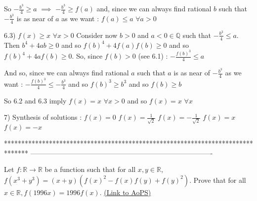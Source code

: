 \begin{solution}
So $ -\frac{b^3}{4}\geq a$ $ \implies$ $ -\frac{b^3}{4}\geq f(a)$ and, since we can always find rational $ b$ such that $ -\frac{b^3}{4}$ is as near of $ a$ as we want : $ f(a)\leq a$ $ \forall a>0$

6.3) $ f(x)\geq x$ $ \forall x>0$
Consider now $ b>0$ and $ a<0\in\mathbb Q$ such that $ -\frac{b^3}{4}\leq a$. Then $ b^4+4ab\geq 0$ and so $ f(b)^4+4f(a)f(b)\geq 0$ and so $ f(b)^4+4af(b)\geq 0$. So, since $ f(b)>0$ (see 6.1) : $ -\frac{f(b)^3}{4}\leq a$

And so, since we can always find rational $ a$ such that $ a$ is as near of $ -\frac{b^3}{4}$ as we want : $ -\frac{f(b)^3}{4}\leq -\frac{b^3}{4}$ and so $ f(b)^3\geq b^3$ and so $ f(b)\geq b$


So 6.2 and 6.3 imply $ f(x)=x$ $ \forall x>0$ and so $ f(x)=x$ $ \forall x$

7) Synthesis of solutions :
$ f(x)=0$
$ f(x)=\frac{1}{\sqrt 2}$
$ f(x)=-\frac{1}{\sqrt 2}$
$ f(x)=x$
$ f(x)=-x$
\end{solution}
*******************************************************************************
-------------------------------------------------------------------------------

\begin{problem}
	Let $ f: \mathbb{R} \rightarrow \mathbb{R}$ be a function such that for all $ x,y \in \mathbb{R}$, $ f(x^3+y^3)=(x+y)(f(x)^2-f(x)f(y)+f(y)^2).$ Prove that for all $ x \in \mathbb{R}, f(1996x)=1996f(x)$.
	\flushright \href{https://artofproblemsolving.com/community/c6h278795}{(Link to AoPS)}
\end{problem}



